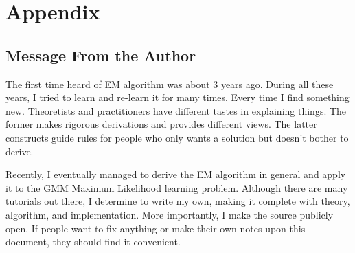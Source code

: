 


\section*{Appendix}

\subsection*{Message From the Author}
The first time heard of EM algorithm was about 3 years ago. 
During all these years, I tried to learn and re-learn it 
for many times. Every time I find something new. Theoretists
and practitioners have different tastes in explaining things. 
The former makes rigorous derivations and provides 
different views. The latter constructs guide rules for 
people who only wants a solution but doesn't bother to 
derive. 

Recently, I eventually managed to derive the EM algorithm
in general and apply it to the GMM Maximum Likelihood learning 
problem. Although there are many tutorials out there, 
I determine to write my own, making it complete with 
theory, algorithm, and implementation. More importantly, 
I make the source publicly open. If people want to fix anything
or make their own notes upon this document, they
should find it convenient. 




